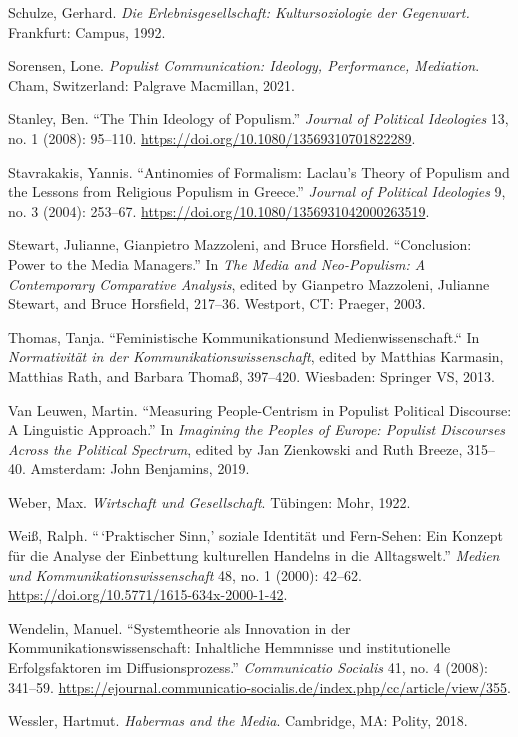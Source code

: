 \documentclass{tufte-handout}
\begin{document}
\begin{hangparas}{.25in}{1}
Schulze, Gerhard. \emph{Die Erlebnisgesellschaft: Kultursoziologie der
Gegenwart.} Frankfurt: Campus, 1992.

Sorensen, Lone. \emph{Populist Communication: Ideology, Performance,
Mediation}. Cham, Switzerland: Palgrave Macmillan, 2021.

Stanley, Ben. ``The Thin Ideology of Populism.'' \emph{Journal of
Political Ideologies} 13, no. 1 (2008): 95--110.
\url{https://doi.org/10.1080/13569310701822289}.

Stavrakakis, Yannis. ``Antinomies of Formalism: Laclau's Theory of
Populism and the Lessons from Religious Populism in Greece.''
\emph{Journal of Political Ideologies} 9, no. 3 (2004): 253--67.
\url{https://doi.org/10.1080/1356931042000263519}.

Stewart, Julianne, Gianpietro Mazzoleni, and Bruce Horsfield.
``Conclusion: Power to the Media Managers.'' In \emph{The Media and
Neo-Populism: A Contemporary Comparative Analysis}, edited by Gianpetro
Mazzoleni, Julianne Stewart, and Bruce Horsfield, 217--36. Westport, CT:
Praeger, 2003.

Thomas, Tanja. ``Feministische Kommunikationsund Medienwissenschaft.``
In \emph{Normativität in der Kommunikationswissenschaft}, edited by
Matthias Karmasin, Matthias Rath, and Barbara Thomaß, 397--420.
Wiesbaden: Springer VS, 2013.

Van Leuwen, Martin. ``Measuring People-Centrism in Populist Political
Discourse: A Linguistic Approach.'' In \emph{Imagining the Peoples of
Europe: Populist Discourses Across the Political Spectrum}, edited by
Jan Zienkowski and Ruth Breeze, 315--40. Amsterdam: John Benjamins,
2019.

Weber, Max. \emph{Wirtschaft und Gesellschaft}. Tübingen: Mohr, 1922.

Weiß, Ralph. ``\,`Praktischer Sinn,' soziale Identität und Fern-Sehen:
Ein Konzept für die Analyse der Einbettung kulturellen Handelns in die
Alltagswelt.'' \emph{Medien und Kommunikationswissenschaft} 48, no. 1
(2000): 42--62. \url{https://doi.org/10.5771/1615-634x-2000-1-42}.

Wendelin, Manuel. ``Systemtheorie als Innovation in der
Kommunikationswissenschaft: Inhaltliche Hemmnisse und institutionelle
Erfolgsfaktoren im Diffusionsprozess.'' \emph{Communicatio Socialis} 41,
no. 4 (2008): 341--59.
\url{https://ejournal.communicatio-socialis.de/index.php/cc/article/view/355}.

Wessler, Hartmut. \emph{Habermas and the Media}. Cambridge, MA: Polity,
2018.


\end{hangparas}
\end{document}
